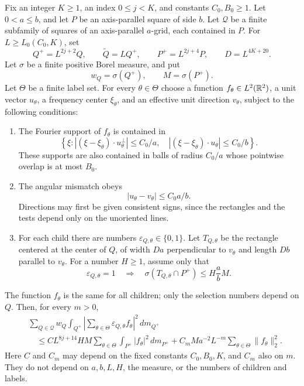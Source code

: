 \begin{proposition}
\label{uf:embeddingprop}
Fix an integer \(K\geq1\), an index \(0\leq j<K\), and constants
\(C_0,B_0\geq1\). Let \(0<a\leq b\), and let \(P\) be an
axis-parallel square of side \(b\). Let \(\mathcal Q\) be a finite
subfamily of squares of an axis-parallel \(a\)-grid, each contained in
\(P\). For \(L\geq L_0(C_0,K)\), set
$$
 Q^+=L^{2j+2}Q,\qquad
 \widetilde Q=LQ^+,\qquad
 P^+=L^{2j+4}P,\qquad D=L^{4K+20}.
$$
Let \(\sigma\) be a finite positive Borel measure, and put
$$
 w_Q=\sigma(Q^+),\qquad M=\sigma(P^+).
$$
Let \(\Theta\) be a finite label set. For every \(\theta\in\Theta\)
choose a function \(f_\theta\in L^2(\mathbb R^2)\), a unit vector
\(u_\theta\), a frequency center \(\xi_\theta\), and an effective
unit direction \(v_\theta\), subject to the following conditions:
\begin{enumerate}
\item The Fourier support of \(f_\theta\) is contained in
$$
 \left\{\xi:
 |(\xi-\xi_\theta)\cdot u_\theta^\perp|\leq C_0/a,
 \quad |(\xi-\xi_\theta)\cdot u_\theta|\leq C_0/b\right\}.
$$
These supports are also contained in balls of radius \(C_0/a\)
whose pointwise overlap is at most \(B_0\).
\item The angular mismatch obeys
$$
 |u_\theta-v_\theta|\leq C_0 a/b.
$$
Directions may first be given consistent signs, since the rectangles
and the tests depend only on the unoriented lines.
\item For each child there are numbers
\(\varepsilon_{Q,\theta}\in\{0,1\}\). Let
\(T_{Q,\theta}\) be the rectangle centered at the center of \(Q\),
of width \(Da\) perpendicular to \(v_\theta\) and length \(Db\)
parallel to \(v_\theta\). For a number \(H\geq1\), assume only that
\begin{equation}\label{uf:embeddinggood}
 \varepsilon_{Q,\theta}=1
 \quad\Longrightarrow\quad
 \sigma(T_{Q,\theta}\cap P^+)
 \leq H\frac ab M.
 \tag{G}
\end{equation}
\end{enumerate}
The function \(f_\theta\) is the same for all children; only the
selection numbers depend on \(Q\). Then, for every \(m>0\),
\begin{align}
 &\sum_{Q\in\mathcal Q}w_Q
   \int_{Q^+}\left|\sum_{\theta\in\Theta}
           \varepsilon_{Q,\theta}f_\theta\right|^2\,dm_{Q^+}
 \label{uf:embeddingconclusion}\\
 &\quad\leq C L^{8j+14}HM
       \sum_{\theta\in\Theta}\int_{P^+}|f_\theta|^2\,dm_{P^+}
   +C_m M a^{-2}L^{-m}
       \sum_{\theta\in\Theta}\|f_\theta\|_2^2.\nonumber
\end{align}
Here \(C\) and \(C_m\) may depend on the fixed constants
\(C_0,B_0,K\), and \(C_m\) also on \(m\). They do not depend on
\(a,b,L,H\), the measure, or the numbers of children and labels.
\end{proposition}

